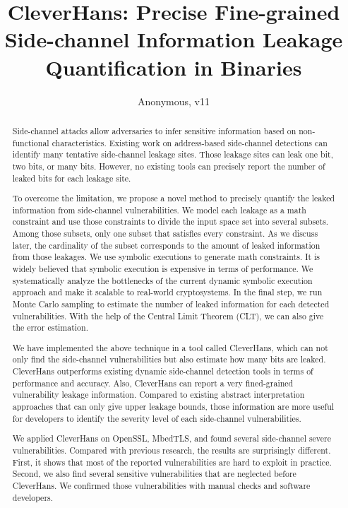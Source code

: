 \documentclass[conference]{IEEEtran}
\newcommand{\tool}{TANA}
\renewcommand{\tool}{CleverHans}
\begin{document}
\title{\tool{}: Precise Fine-grained Side-channel Information Leakage Quantification in Binaries}
\author{Anonymous, v11}

\maketitle

\begin{abstract}
    Side-channel attacks allow adversaries to infer sensitive
    information based on non-functional characteristics. 
    Existing work on address-based side-channel detections can identify many tentative side-channel leakage sites. Those leakage sites can leak one bit, two bits, or many bits. However, no existing tools can
    precisely report the number of leaked bits for each leakage site.
       
    To overcome the limitation, we propose a novel method to precisely quantify the leaked information from side-channel vulnerabilities. 
    We model each leakage as a math constraint and use those
    constraints to divide the input space set into several subsets.
    Among those subsets, only one subset that satisfies every constraint.
    As we discuss later, the cardinality of the subset corresponds to the amount of leaked information from those leakages. We use symbolic executions to generate math constraints. It is widely believed that symbolic execution is expensive in terms of performance. We systematically analyze the bottlenecks of the current dynamic symbolic execution approach and make it scalable to real-world cryptosystems. In the final step, we run Monte Carlo sampling to estimate the number of leaked information for each detected vulnerabilities. With the help of the Central Limit Theorem (CLT),
    we can also give the error estimation.

    We have implemented the above technique in a tool called \tool{}, which can not only find the side-channel vulnerabilities but also estimate how many bits are leaked. 
    \tool{} outperforms existing dynamic side-channel detection tools in terms of performance and accuracy. Also, \tool{} can report a very fined-grained vulnerability leakage information.
    Compared to existing abstract interpretation approaches that can only give upper leakage
    bounds, those information are more useful for developers to identify the severity level
    of each side-channel vulnerabilities.
    
    We applied \tool{} on OpenSSL, MbedTLS, and found several side-channel severe vulnerabilities. Compared with previous research, the results are surprisingly different. 
    First, it shows that most of the reported vulnerabilities are hard to exploit in practice. 
    Second, we also find several sensitive vulnerabilities that are neglected before \tool{}. 
    We confirmed those vulnerabilities with manual checks and software developers.

\end{abstract}
\end{document}
